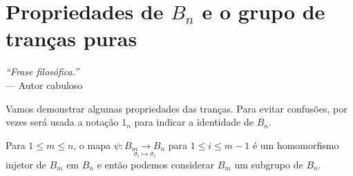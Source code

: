 \chapter[Propriedades de \texorpdfstring{$B_n$}{Bn} e o grupo de tranças puras]{Propriedades de \texorpdfstring{$B_n$}{Bn} e o grupo de tranças puras}
\label{cap-4}
\chaptermark{}
%
\hfill%
\begin{minipage}{10cm}
\begin{flushright}
\rightskip=0.5cm
\textit{``Frase filosófica.''}
\\[0.1cm]
\rightskip=0.5cm
--- Autor cabuloso
\end{flushright}
\end{minipage}

\hspace{12pt} Vamos demonstrar algumas propriedades das tranças. Para evitar confusões, por vezes será usada a notação $1_n$ para indicar a identidade de $B_n$.
	
	
	
	
	
	\begin{prop}
		\label{B_m subgrupo de B_n}
		Para $1\leq m\leq n$, o mapa $\psi: \underset{\sigma_i\mapsto\sigma_i}{B_m\to B_n}$ para $1\leq i\leq m-1$ é um homomorfismo injetor de $B_m$ em $B_n$ e então podemos considerar $B_m$ um subgrupo de $B_n$. 
	\end{prop}
	

